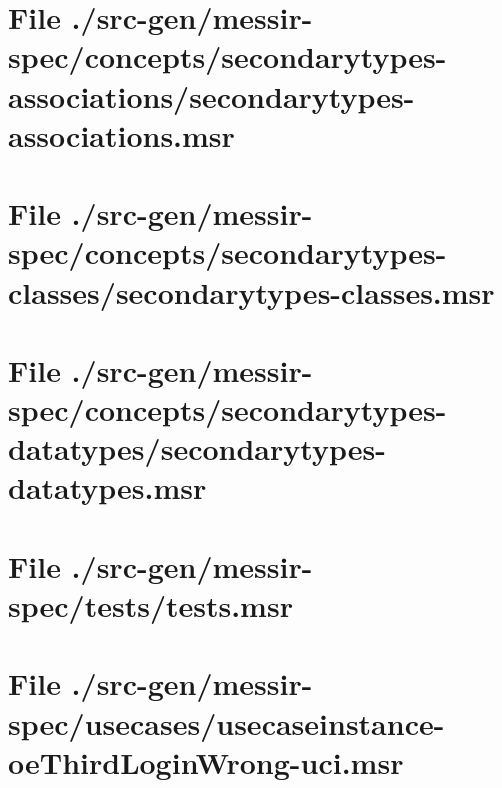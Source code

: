 \section[File /src-gen/messir-spec/concepts.../secondarytypes-associations.msr]{File ./src-gen/messir-spec/concepts/secondarytypes-associations/secondarytypes-associations.msr}
\scriptsize

\normalsize
	
\section[File /src-gen/messir-spec/concepts.../secondarytypes-classes.msr]{File ./src-gen/messir-spec/concepts/secondarytypes-classes/secondarytypes-classes.msr}
\scriptsize

\normalsize
	
\section[File /src-gen/messir-spec/concepts.../secondarytypes-datatypes.msr]{File ./src-gen/messir-spec/concepts/secondarytypes-datatypes/secondarytypes-datatypes.msr}
\scriptsize

\normalsize
	
\section[File /src-gen/messir-spec/tests/tests.msr]{File ./src-gen/messir-spec/tests/tests.msr}
\scriptsize

\normalsize
	
\section[File /src-gen/messir-spec/usecases/usecaseinstance-oeThirdLoginWrong-uci.msr]{File ./src-gen/messir-spec/usecases/usecaseinstance-oeThirdLoginWrong-uci.msr}
\scriptsize

\normalsize
	
